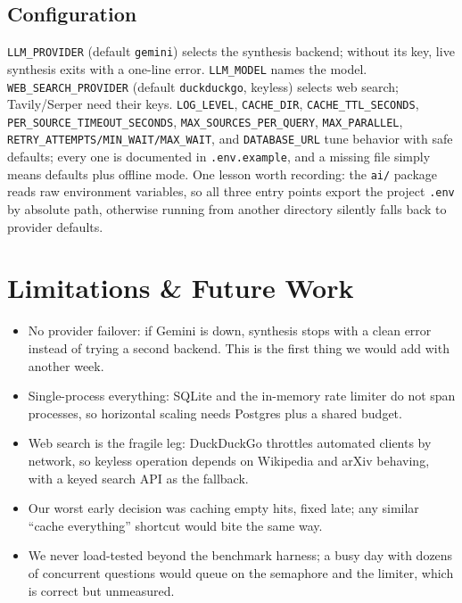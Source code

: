 \documentclass[11pt,a4paper]{article}
\begin{document}
\subsection{Configuration}

\texttt{LLM\_PROVIDER} (default \texttt{gemini}) selects the synthesis backend; without its key, live synthesis exits with a one-line error. \texttt{LLM\_MODEL} names the model. \texttt{WEB\_SEARCH\_PROVIDER} (default \texttt{duckduckgo}, keyless) selects web search; Tavily/Serper need their keys. \texttt{LOG\_LEVEL}, \texttt{CACHE\_DIR}, \texttt{CACHE\_TTL\_SECONDS}, \texttt{PER\_SOURCE\_TIMEOUT\_SECONDS}, \texttt{MAX\_SOURCES\_PER\_QUERY}, \texttt{MAX\_PARALLEL}, \texttt{RETRY\_ATTEMPTS/MIN\_WAIT/MAX\_WAIT}, and \texttt{DATABASE\_URL} tune behavior with safe defaults; every one is documented in \texttt{.env.example}, and a missing file simply means defaults plus offline mode. One lesson worth recording: the \texttt{ai/} package reads raw environment variables, so all three entry points export the project \texttt{.env} by absolute path, otherwise running from another directory silently falls back to provider defaults.

\section{Limitations \& Future Work}\label{sec:limits}

\begin{itemize}[leftmargin=2em,itemsep=2pt]
\item No provider failover: if Gemini is down, synthesis stops with a clean error instead of trying a second backend. This is the first thing we would add with another week.
\item Single-process everything: SQLite and the in-memory rate limiter do not span processes, so horizontal scaling needs Postgres plus a shared budget.
\item Web search is the fragile leg: DuckDuckGo throttles automated clients by network, so keyless operation depends on Wikipedia and arXiv behaving, with a keyed search API as the fallback.
\item Our worst early decision was caching empty hits, fixed late; any similar ``cache everything'' shortcut would bite the same way.
\item We never load-tested beyond the benchmark harness; a busy day with dozens of concurrent questions would queue on the semaphore and the limiter, which is correct but unmeasured.
\end{itemize}
\end{document}

